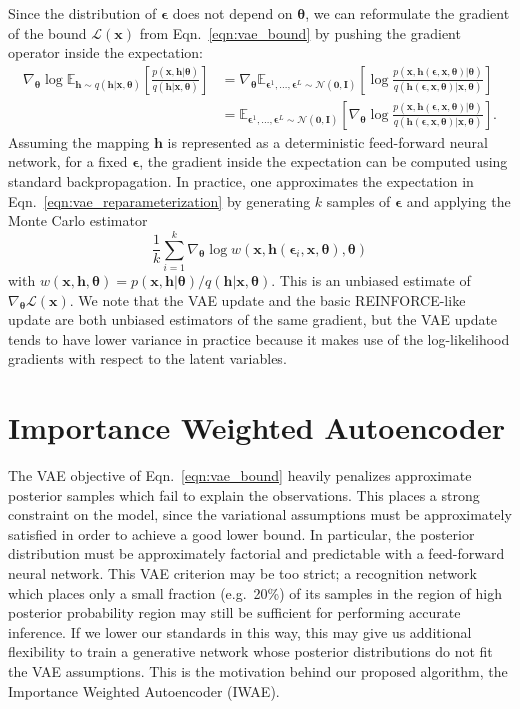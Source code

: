 \documentclass{article} %
\newcommand{\expect}{\mathbb{E}}
\newcommand{\normal}{\mathcal{N}}
\newcommand{\zeroVec}{\mathbf{0}}
\newcommand{\identity}{\mathbf{I}}
\newcommand{\hid}{\mathbf{h}}
\newcommand{\params}{{\boldsymbol{\theta}}}
\newcommand{\obs}{\mathbf{x}}
\newcommand{\numLayers}{L}
\newcommand{\pmfGen}{p}
\newcommand{\pmfRec}{q}
\newcommand{\varBound}{\mathcal{L}}
\newcommand{\numSamples}{k}
\newcommand{\sampleIdx}{i}
\newcommand{\aux}{\boldsymbol{\epsilon}}
\newcommand{\auxLayer}[1]{\aux^{#1}}
\newcommand{\auxS}[1]{\aux_{#1}}
\newcommand{\isWeight}{w}
\begin{document}
Since the distribution of $\aux$ does not depend on $\params$, we can reformulate the gradient of the bound $\varBound(\obs)$ from Eqn.~\ref{eqn:vae_bound} by pushing the gradient operator inside the expectation:
\begin{align}
\nabla_{\params} \log \expect_{\hid\sim \pmfRec(\hid|\obs,\params)} \left[ \frac{\pmfGen(\obs,\hid|\params)}{\pmfRec(\hid|\obs,\params)} \right] 
&= \nabla_{\params} \expect_{\auxLayer{1}, \ldots, \auxLayer{\numLayers}\sim \normal(\zeroVec, \identity)} \left[ \log \frac{\pmfGen(\obs,\hid(\aux, \obs, \params)|\params)}{\pmfRec(\hid(\aux, \obs, \params)|\obs,\params)} \right] \\
&= \expect_{\auxLayer{1}, \ldots, \auxLayer{\numLayers} \sim \normal(\zeroVec, \identity)} \left[ \nabla_{\params}\log \frac{\pmfGen(\obs,\hid(\aux, \obs, \params)|\params)}{\pmfRec(\hid(\aux, \obs, \params)|\obs,\params)} \right]. \label{eqn:vae_reparameterization}
\end{align}
Assuming the mapping $\hid$ is represented as a deterministic feed-forward neural network, for a fixed $\aux$, the gradient inside the expectation can be computed using standard backpropagation. In practice, one approximates the expectation in Eqn.~\ref{eqn:vae_reparameterization} by generating $\numSamples$ samples of $\aux$ and applying the Monte Carlo estimator
\begin{equation}
\label{eqn:ksample_var_grad}
\frac{1}{\numSamples}\sum_{\sampleIdx=1}^\numSamples\nabla_{\params}\log \isWeight \left(\obs, \hid(\auxS{\sampleIdx}, \obs, \params), \params\right)
\end{equation}
with $\isWeight(\obs,\hid,\params)= \pmfGen(\obs,\hid|\params) / \pmfRec(\hid|\obs,\params)$. This is an unbiased estimate of $\nabla_\params \varBound(\obs)$. We note that the VAE update and the basic REINFORCE-like update are both unbiased estimators of the same gradient, but the VAE update tends to have lower variance in practice because it makes use of the log-likelihood gradients with respect to the latent variables.


\section{Importance Weighted Autoencoder}
\label{sec:iwae}

The VAE objective of Eqn.~\ref{eqn:vae_bound} heavily penalizes approximate posterior samples which fail to explain the observations. This places a strong constraint on the model, since the variational assumptions must be approximately satisfied in order to achieve a good lower bound. In particular, the posterior distribution must be approximately factorial and predictable with a feed-forward neural network. This VAE criterion may be too strict; a recognition network which places only a small fraction (e.g.~20\%) of its samples in the region of high posterior probability region may still be sufficient for performing accurate inference. If we lower our standards in this way, this may give us additional flexibility to train a generative network whose posterior distributions do not fit the VAE assumptions. This is the motivation behind our proposed algorithm, the Importance Weighted Autoencoder (IWAE).
\end{document}
